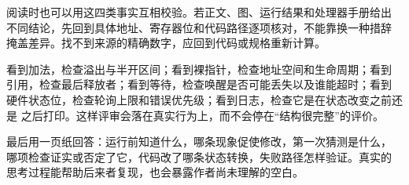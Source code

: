 阅读时也可以用这四类事实互相校验。若正文、图、运行结果和处理器手册给出
不同结论，先回到具体地址、寄存器位和代码路径逐项核对，不能靠换一种措辞
掩盖差异。找不到来源的精确数字，应回到代码或规格重新计算。

看到加法，检查溢出与半开区间；看到裸指针，检查地址空间和生命周期；看到
引用，检查最后释放者；看到等待，检查唤醒是否可能丢失以及谁能超时；看到
硬件状态位，检查轮询上限和错误优先级；看到日志，检查它是在状态改变之前还是
之后打印。这样评审会落在真实行为上，而不会停在“结构很完整”的评价。

最后用一页纸回答：运行前知道什么，哪条现象促使修改，第一次猜测是什么，
哪项检查证实或否定了它，代码改了哪条状态转换，失败路径怎样验证。真实的
思考过程能帮助后来者复现，也会暴露作者尚未理解的空白。
